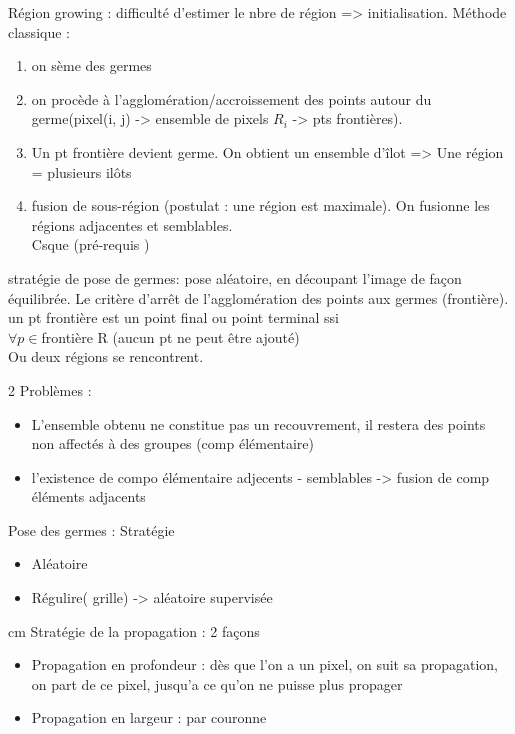\documentclass[11pt]{article}
\begin{document}
Région growing : difficulté d'estimer le nbre de région => initialisation. Méthode classique : 
\begin{enumerate}
	\item on sème des germes
	\item on procède à l'agglomération/accroissement des points autour du germe(pixel(i, j) -> ensemble de pixels $R_i$ -> pts frontières). 
	\item Un pt frontière devient germe. On obtient un ensemble d'îlot => Une région = plusieurs ilôts
	\item fusion de sous-région (postulat : une région est maximale). On fusionne les régions adjacentes et semblables.\\
		Csque (pré-requis )
\end{enumerate}

stratégie de pose de germes: pose aléatoire, en découpant l'image de façon équilibrée.
Le critère d'arrêt de l'agglomération des points aux germes (frontière).\\
un pt frontière est un point final ou point terminal ssi\\
$\forall p \in $frontière R (aucun pt ne peut être ajouté)\\
Ou deux régions se rencontrent.

\vskip 1cm 

2 Problèmes :
\begin{itemize}
	\item L'ensemble obtenu ne constitue pas un recouvrement, il restera des points non affectés à des groupes (comp élémentaire)
	\item l'existence de compo élémentaire adjecents - semblables -> fusion de comp éléments adjacents
\end{itemize}


\vskip 1cm
Pose des germes : Stratégie
\begin{itemize}
	\item Aléatoire
	\item Régulire( grille) -> aléatoire supervisée
\end{itemize}

 cm
Stratégie de la propagation : 2 façons
\begin{itemize}
	\item Propagation en profondeur : dès que l'on a un pixel, on suit sa propagation, on part de ce pixel, jusqu'a ce qu'on ne puisse plus propager
	\item Propagation en largeur : par couronne
\end{itemize}
\end{document}
